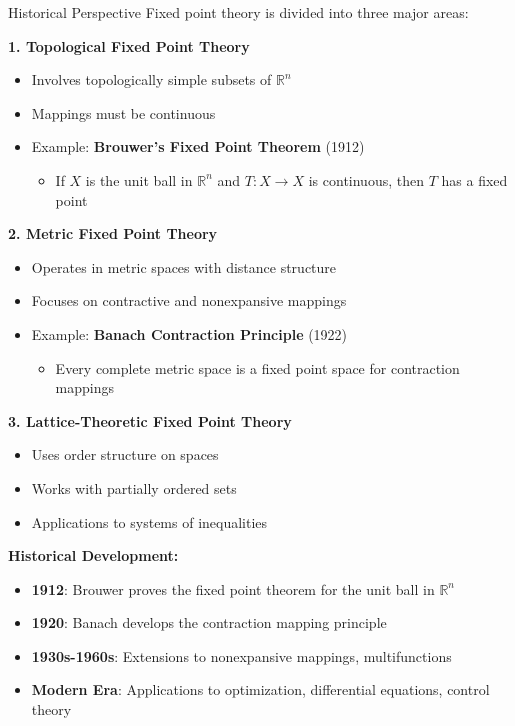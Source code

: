 \documentclass[aspectratio=169,10pt]{beamer}
\begin{document}
\begin{frame}[allowframebreaks]{Historical Perspective}
    Fixed point theory is divided into three major areas:

    \vspace{0.4cm}
    \textbf{1. Topological Fixed Point Theory}
    \begin{itemize}
        \item Involves topologically simple subsets of $\mathbb{R}^n$
        \item Mappings must be continuous
        \item Example: \textbf{Brouwer's Fixed Point Theorem} (1912)
            \begin{itemize}
                \item If $X$ is the unit ball in $\mathbb{R}^n$ and $T: X \to X$ is continuous, then $T$ has a fixed point
            \end{itemize}
    \end{itemize}

    \vspace{0.4cm}
    \textbf{2. Metric Fixed Point Theory}
    \begin{itemize}
        \item Operates in metric spaces with distance structure
        \item Focuses on contractive and nonexpansive mappings
        \item Example: \textbf{Banach Contraction Principle} (1922)
            \begin{itemize}
                \item Every complete metric space is a fixed point space for contraction mappings
            \end{itemize}
    \end{itemize}

    \vspace{0.4cm}
    \textbf{3. Lattice-Theoretic Fixed Point Theory}
    \begin{itemize}
        \item Uses order structure on spaces
        \item Works with partially ordered sets
        \item Applications to systems of inequalities
    \end{itemize}

    \framebreak

    \textbf{Historical Development:}
    \begin{itemize}
        \item \textbf{1912}: Brouwer proves the fixed point theorem for the unit ball in $\mathbb{R}^n$
        \item \textbf{1920}: Banach develops the contraction mapping principle
        \item \textbf{1930s-1960s}: Extensions to nonexpansive mappings, multifunctions
        \item \textbf{Modern Era}: Applications to optimization, differential equations, control theory
    \end{itemize}
\end{frame}
\end{document}
